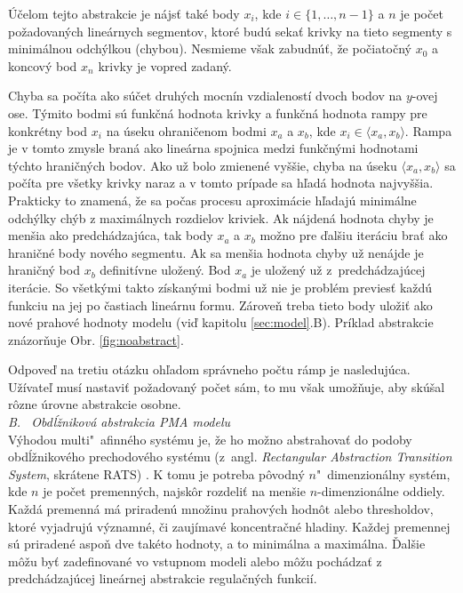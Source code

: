 \documentclass[11pt,final,oneside]{fithesis}
\begin{document}
\' U\v celom tejto abstrakcie je n\'ajs\v t tak\'e body $x_i$, kde $i \in \{1,\dots{},n-1\}$ a $n$ je po\v cet po\v zadovan\'ych line\'arnych segmentov, 
ktor\'e bud\'u 
seka\v t krivky na tieto segmenty s minim\'alnou odch\'ylkou (chybou). Nesmieme v\v sak zabudn\'u\v t, \v ze po\v ciato\v cn\'y $x_0$ a koncov\'y bod $x_n$ 
krivky je vopred zadan\'y. 

Chyba sa po\v c\'ita ako s\'u\v cet druh\'ych mocn\'in vzdialenost\'i dvoch 
bodov na $y$-ovej ose. T\'ymito bodmi s\'u funk\v cn\'a hodnota krivky a funk\v cn\'a hodnota rampy pre konkr\'etny bod $x_i$ na \'useku ohrani\v cenom bodmi 
$x_a$ a $x_b$, kde $x_i \in \langle x_a,x_b\rangle$. Rampa je v tomto zmysle bran\'a ako line\'arna spojnica medzi funk\v cn\'ymi hodnotami t\'ychto
hrani\v cn\'ych bodov. Ako u\v z bolo zmienen\'e vy\v s\v sie, chyba na \'useku $\langle x_a,x_b\rangle$ sa po\v c\'ita pre v\v setky krivky naraz a v tomto 
pr\'ipade sa h\v lad\'a hodnota najvy\v s\v sia. Prakticky to znamen\'a, \v ze sa po\v cas procesu aproxim\'acie h\v ladaj\'u minim\'alne odch\'ylky ch\'yb z 
maxim\'alnych rozdielov kriviek. 
Ak n\'ajden\'a hodnota chyby je men\v sia ako predch\'adzaj\'uca, tak body $x_a$ a $x_b$ mo\v zno pre \v dal\v siu iter\'aciu bra\v t ako hrani\v cn\'e body 
nov\'eho segmentu. Ak sa men\v sia hodnota chyby u\v z nen\'ajde je hrani\v cn\'y bod $x_b$ definit\'ivne ulo\v zen\'y. Bod $x_a$ je ulo\v zen\'y u\v z 
z~predch\'adzaj\'ucej iter\'acie.
So v\v setk\'ymi takto z\'iskan\'ymi bodmi u\v z nie je probl\'em previes\v t ka\v zd\'u funkciu na jej po \v castiach 
line\'arnu formu. Z\'arove\v n treba tieto body ulo\v zi\v t ako nov\'e prahov\'e hodnoty modelu (vi\v d kapitolu \ref{sec:model}.B). 
Pr\'iklad abstrakcie zn\'azor\v nuje Obr. \ref{fig:noabstract}.

Odpove\v d na tretiu ot\'azku oh\v ladom spr\'avneho po\v ctu r\'amp je nasleduj\'uca.
U\v z\'ivate\v l mus\'i nastavi\v t po\v zadovan\'y po\v cet s\'am, to mu v\v sak umo\v z\v nuje, aby sk\'u\v sal r\^ ozne \'urovne abstrakcie osobne.
\cite{CAV-2011}
\\

\noindent
\textit{B. \ Obd\'l\v znikov\'a abstrakcia PMA modelu}
\\

V\'yhodou multi"~afinn\'eho syst\'emu je, \v ze ho mo\v zno abstrahova\v t do podoby obd\'l\v znikov\'eho prechodov\'eho syst\'emu (z~angl. \textit{
Rectangular Abstraction Transition System}, skr\'atene RATS) \cite{RATS}. K tomu je potreba p\^ ovodn\'y $n$"~di\-men\-zion\'alny syst\'em, kde $n$ je po\v cet 
premenn\'ych, najsk\^ or rozdeli\v t na men\v sie $n$-dimenzion\'alne oddiely. Ka\v zd\'a premenn\'a m\'a priraden\'u mno\v zinu prahov\'ych hodn\^ ot alebo
thresholdov, ktor\'e vyjadruj\'u v\'yznamn\'e, \v ci zauj\'imav\'e koncentra\v cn\'e hladiny. Ka\v zdej premennej s\'u priraden\'e aspo\v n dve tak\'eto 
hodnoty, a to minim\'alna a maxim\'alna. \v Dal\v sie m\^ o\v zu by\v t zadefinovan\'e vo vstupnom modeli alebo m\^ o\v zu poch\'adza\v t z predch\'adzaj\'ucej
line\'arnej abstrakcie regula\v cn\'ych funkci\'i.
\end{document}
